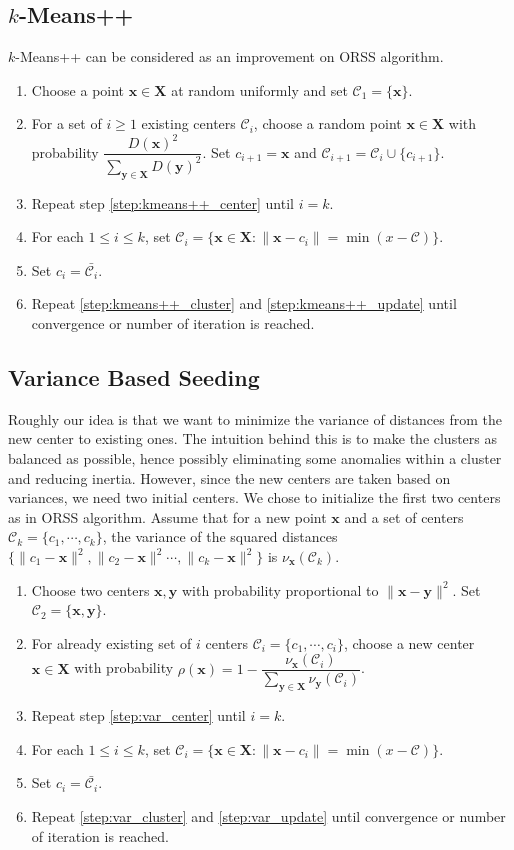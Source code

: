 \documentclass[twoside, 11pt]{article}
\newcommand{\x}{\mathbf{x}}
\newcommand{\X}{\mathbf{X}}
\newcommand{\y}{\mathbf{y}}
\newcommand{\C}{\mathcal{C}}
\begin{document}
	\subsection{$k$-Means++}
	$k$-Means++ \citep{kmeans++} can be considered as an improvement on ORSS algorithm.
		\begin{enumerate}[i]
			\item Choose a point $\x\in\X$ at random uniformly and set $\C_1=\{\x\}$.
			\item For a set of $i\geq1$ existing centers $\C_i$, choose a random point $\x\in\X$ with probability $\dfrac{D(\x)^2}{\sum_{\y\in\X}D(\y)^2}$. Set $c_{i+1}=\x$ and $\C_{i+1}=\C_i\cup\{c_{i+1}\}$.\label{step:kmeans++_center}
			\item Repeat step \eqref{step:kmeans++_center} until $i=k$.
			\item For each $1\leq i\leq k$, set $\C_i=\{\x\in\X:\|\x-c_i\|=\min(x-\C)\}$.\label{step:kmeans++_cluster}
			\item Set $c_i=\bar{\C_i}$.\label{step:kmeans++_update}
			\item Repeat \eqref{step:kmeans++_cluster} and \eqref{step:kmeans++_update} until convergence or number of iteration is reached.\label{step:kmeans++_repeat}
		\end{enumerate}
	\subsection{Variance Based Seeding}
	Roughly our idea is that we want to minimize the variance of distances from the new center to existing ones. The intuition behind this is to make the clusters as balanced as possible, hence possibly eliminating some anomalies within a cluster and reducing inertia. However, since the new centers are taken based on variances, we need two initial centers. We chose to initialize the first two centers as in ORSS algorithm. Assume that for a new point $\x$ and a set of centers $\C_k=\{c_1,\cdots,c_k\}$, the variance of the squared distances $\{\| c_1-\x\|^2,\|c_2-\x\|^2\cdots,\| c_k-\x\|^2\}$ is $\nu_\x(\C_k)$.
		\begin{enumerate}[i]
			\item Choose two centers $\x,\y$ with probability proportional to $\|\x-\y\|^2$. Set $\C_2=\{\x,\y\}$.
			\item For already existing set of $i$ centers $\mathcal{C}_i=\{c_1,\cdots,c_i\}$, choose a new center $\x\in\X$ with probability $\rho(\x)=1-\dfrac{\nu_\x(\C_i)}{\sum_{\y\in\X}\nu_\y(\C_i)}$.\label{step:var_center}
			\item Repeat step \eqref{step:var_center} until $i=k$.
			\item For each $1\leq i\leq k$, set $\C_i=\{\x\in\X:\|\x-c_i\|=\min(x-\C)\}$.\label{step:var_cluster}
			\item Set $c_i=\bar{\C_i}$.\label{step:var_update}
			\item Repeat \eqref{step:var_cluster} and \eqref{step:var_update} until convergence or number of iteration is reached.
		\end{enumerate}
\end{document}

